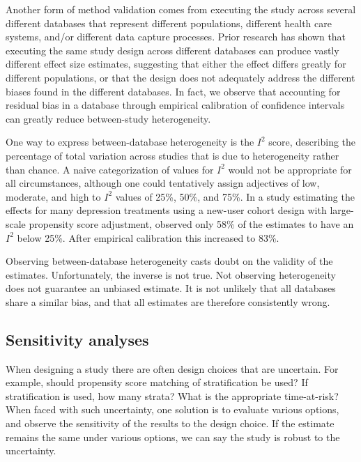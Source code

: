 \documentclass[11pt]{book}
\theoremstyle{definition}
\theoremstyle{definition}
\theoremstyle{definition}
\theoremstyle{remark}
\let\BeginKnitrBlock\begin \let\EndKnitrBlock\end
\begin{document}
Another form of method validation comes from executing the study across several different databases that represent different populations, different health care systems, and/or different data capture processes. Prior research has shown that executing the same study design across different databases can produce vastly different effect size estimates, \citep{madigan_2013} suggesting that either the effect differs greatly for different populations, or that the design does not adequately address the different biases found in the different databases. In fact, we observe that accounting for residual bias in a database through empirical calibration of confidence intervals can greatly reduce between-study heterogeneity. \citep{schuemie_2018}

One way to express between-database heterogeneity is the \(I^2\) score, describing the percentage of total variation across studies that is due to heterogeneity rather than chance. \citep{higgins_2003} A naive categorization of values for \(I^2\) would not be appropriate for all circumstances, although one could tentatively assign adjectives of low, moderate, and high to \(I^2\) values of 25\%, 50\%, and 75\%. In a study estimating the effects for many depression treatments using a new-user cohort design with large-scale propensity score adjustment, \citep{schuemie_2018b} observed only 58\% of the estimates to have an \(I^2\) below 25\%. After empirical calibration this increased to 83\%.

\BeginKnitrBlock{rmdimportant}
Observing between-database heterogeneity casts doubt on the validity of the estimates. Unfortunately, the inverse is not true. Not observing heterogeneity does not guarantee an unbiased estimate. It is not unlikely that all databases share a similar bias, and that all estimates are therefore consistently wrong.
\EndKnitrBlock{rmdimportant}

\hypertarget{sensitivity-analyses}{%
\subsection{Sensitivity analyses}\label{sensitivity-analyses}}

When designing a study there are often design choices that are uncertain. For example, should propensity score matching of stratification be used? If stratification is used, how many strata? What is the appropriate time-at-risk? When faced with such uncertainty, one solution is to evaluate various options, and observe the sensitivity of the results to the design choice. If the estimate remains the same under various options, we can say the study is robust to the uncertainty.
\end{document}
